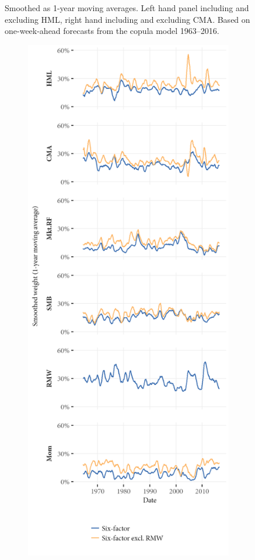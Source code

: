 \begin{figure}[htbp]
  \begin{longcaption}
    Smoothed as 1-year moving averages. Left hand panel including and excluding HML, right hand including and excluding CMA. Based on one-week-ahead forecasts from the copula model 1963--2016.
  \end{longcaption}
  \label{fig:cdb_optimal_6}
\end{figure}

\begin{figure}[htbp]
  \ContinuedFloat
  \centering
  \begin{subfigure}{0.45\textwidth}
    \includegraphics[width=\textwidth]{graphics/weights/appendix_Weights_CDB_6F_6F_EXCL_RMW.png}

\end{subfigure}
\end{figure}
